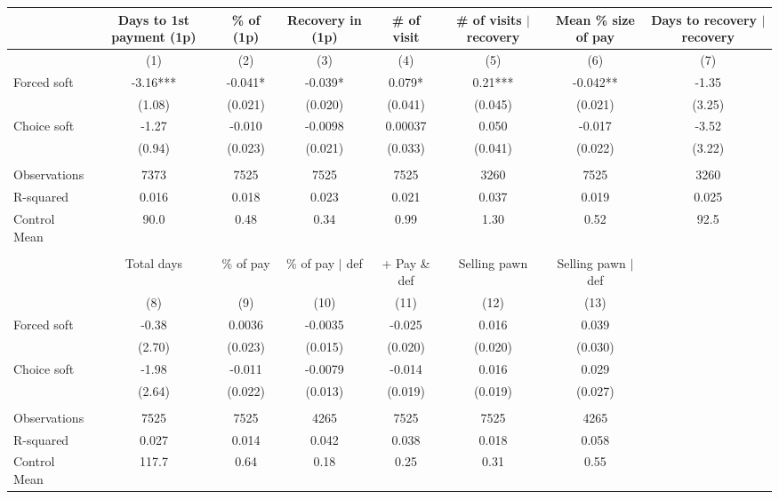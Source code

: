 \begin{tabular}{lccccccc}
\toprule
      & Days to 1st payment (1p) & \% of (1p) & Recovery in (1p) & \# of visit & \# of visits $|$ recovery & Mean \% size of pay & Days to recovery $|$ recovery \\
\midrule
\midrule
      & (1)   & (2)   & (3)   & (4)   & (5)   & (6)   & (7) \\
\midrule
\midrule
Forced soft & -3.16*** & -0.041* & -0.039* & 0.079* & 0.21*** & -0.042** & -1.35 \\
      & (1.08) & (0.021) & (0.020) & (0.041) & (0.045) & (0.021) & (3.25) \\
Choice soft & -1.27 & -0.010 & -0.0098 & 0.00037 & 0.050 & -0.017 & -3.52 \\
      & (0.94) & (0.023) & (0.021) & (0.033) & (0.041) & (0.022) & (3.22) \\
      &       &       &       &       &       &       &  \\
\midrule
Observations & 7373  & 7525  & 7525  & 7525  & 3260  & 7525  & 3260 \\
R-squared & 0.016 & 0.018 & 0.023 & 0.021 & 0.037 & 0.019 & 0.025 \\
Control Mean & 90.0  & 0.48  & 0.34  & 0.99  & 1.30  & 0.52  & 92.5 \\
\midrule
\midrule
      &       &       &       &       &       &       &  \\
\midrule
      & Total days & \% of pay & \% of pay $|$ def  & + Pay \& def & Selling pawn & Selling pawn $|$ def &  \\
\midrule
\midrule
      & (8)   & (9)   & (10)  & (11)  & (12)  & (13)  &  \\
\midrule
\midrule
Forced soft & -0.38 & 0.0036 & -0.0035 & -0.025 & 0.016 & 0.039 &  \\
      & (2.70) & (0.023) & (0.015) & (0.020) & (0.020) & (0.030) &  \\
Choice soft & -1.98 & -0.011 & -0.0079 & -0.014 & 0.016 & 0.029 &  \\
      & (2.64) & (0.022) & (0.013) & (0.019) & (0.019) & (0.027) &  \\
      &       &       &       &       &       &       &  \\
\midrule
Observations & 7525  & 7525  & 4265  & 7525  & 7525  & 4265  &  \\
R-squared & 0.027 & 0.014 & 0.042 & 0.038 & 0.018 & 0.058 &  \\
Control Mean & 117.7 & 0.64  & 0.18  & 0.25  & 0.31  & 0.55  &  \\
\bottomrule
\bottomrule
\end{tabular}%
